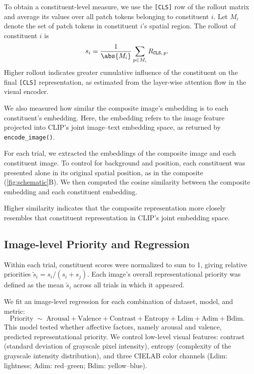 \documentclass{article}
\begin{document}
To obtain a constituent-level measure, we use the \texttt{[CLS]} row of the rollout matrix and average its values over all patch tokens belonging to constituent $i$. 
Let $M_i$ denote the set of patch tokens in constituent
$i$'s spatial region. The rollout of constituent $i$ is
\begin{equation}
  s_i = \frac{1}{\abs{M_i}} \sum_{p \in M_i} R_{\texttt{CLS},\, p}.
\end{equation}
Higher rollout indicates greater cumulative influence of the constituent on the final \texttt{[CLS]} representation, as estimated from the layer-wise attention flow in the visual encoder.

We also measured how similar the composite image's embedding is to each
constituent's embedding. Here, the embedding refers to the image feature
projected into CLIP's joint image--text embedding space, as returned by
\texttt{encode\_image()}.

For each trial, we extracted the embeddings of the composite image and each constituent image. 
To control for background and position, each constituent was presented alone in its original spatial position, as in the composite (\cref{fig:schematic}B). 
We then computed the cosine similarity between the composite embedding and each constituent embedding.

Higher similarity indicates that the composite representation more closely
resembles that constituent representation in CLIP's joint embedding space.

\subsection{Image-level Priority and Regression}

Within each trial, constituent scores were normalized to sum to 1, giving
relative priorities $\tilde{s}_i = s_i / (s_i + s_j)$. Each image's overall
representational priority was defined as the mean $\tilde{s}_i$ across all trials in which it appeared.

We fit an image-level regression for each combination of dataset, model, and metric:
\begin{equation}
\label{eq:regression}
  \mathrm{Priority} \;\sim\;
  \mathrm{Arousal} + \mathrm{Valence} +
  \mathrm{Contrast} + \mathrm{Entropy} +
  \mathrm{Ldim} + \mathrm{Adim} + \mathrm{Bdim}.
\end{equation}
This model tested whether affective factors, namely arousal and valence,
predicted representational priority. We control low-level visual features:
contrast (standard deviation of grayscale pixel intensity), entropy
(complexity of the grayscale intensity distribution), and three CIELAB color
channels (Ldim: lightness; Adim: red--green; Bdim: yellow--blue).
\end{document}

